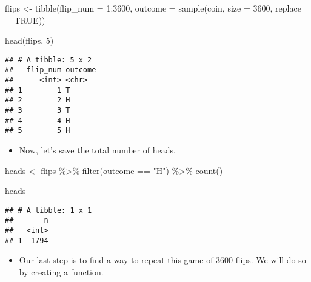 \documentclass[
]{article}
\newenvironment{Shaded}{\begin{snugshade}}{\end{snugshade}}
\newcommand{\AttributeTok}[1]{\textcolor[rgb]{0.77,0.63,0.00}{#1}}
\newcommand{\ConstantTok}[1]{\textcolor[rgb]{0.00,0.00,0.00}{#1}}
\newcommand{\DecValTok}[1]{\textcolor[rgb]{0.00,0.00,0.81}{#1}}
\newcommand{\FunctionTok}[1]{\textcolor[rgb]{0.00,0.00,0.00}{#1}}
\newcommand{\NormalTok}[1]{#1}
\newcommand{\OtherTok}[1]{\textcolor[rgb]{0.56,0.35,0.01}{#1}}
\newcommand{\SpecialCharTok}[1]{\textcolor[rgb]{0.00,0.00,0.00}{#1}}
\newcommand{\StringTok}[1]{\textcolor[rgb]{0.31,0.60,0.02}{#1}}
\providecommand{\tightlist}{%
  \setlength{\itemsep}{0pt}\setlength{\parskip}{0pt}}
\begin{document}
\begin{Shaded}
\begin{Highlighting}[]
\NormalTok{flips }\OtherTok{\textless{}{-}} \FunctionTok{tibble}\NormalTok{(}\AttributeTok{flip\_num =} \DecValTok{1}\SpecialCharTok{:}\DecValTok{3600}\NormalTok{, }
                \AttributeTok{outcome =} \FunctionTok{sample}\NormalTok{(coin, }\AttributeTok{size =} \DecValTok{3600}\NormalTok{, }\AttributeTok{replace =} \ConstantTok{TRUE}\NormalTok{))}

\FunctionTok{head}\NormalTok{(flips, }\DecValTok{5}\NormalTok{)}
\end{Highlighting}
\end{Shaded}

\begin{verbatim}
## # A tibble: 5 x 2
##   flip_num outcome
##      <int> <chr>  
## 1        1 T      
## 2        2 H      
## 3        3 T      
## 4        4 H      
## 5        5 H
\end{verbatim}

\begin{itemize}
\tightlist
\item
  Now, let's save the total number of heads.
\end{itemize}

\begin{Shaded}
\begin{Highlighting}[]
\NormalTok{heads }\OtherTok{\textless{}{-}}\NormalTok{ flips }\SpecialCharTok{\%\textgreater{}\%} 
  \FunctionTok{filter}\NormalTok{(outcome }\SpecialCharTok{==} \StringTok{"H"}\NormalTok{) }\SpecialCharTok{\%\textgreater{}\%} 
  \FunctionTok{count}\NormalTok{()}

\NormalTok{heads}
\end{Highlighting}
\end{Shaded}

\begin{verbatim}
## # A tibble: 1 x 1
##       n
##   <int>
## 1  1794
\end{verbatim}

\begin{itemize}
\tightlist
\item
  Our last step is to find a way to repeat this game of 3600 flips. We will do so by creating a function.
\end{itemize}
\end{document}
